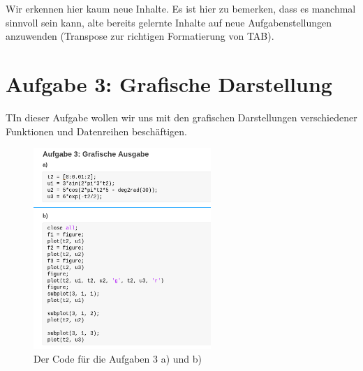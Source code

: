 \documentclass{article}
\begin{document}
Wir erkennen hier kaum neue Inhalte. Es ist hier zu bemerken, dass es manchmal sinnvoll sein kann, alte bereits gelernte Inhalte auf neue Aufgabenstellungen anzuwenden (Transpose zur richtigen Formatierung von TAB).
\newpage
\newpage


\section{Aufgabe 3: Grafische Darstellung}

\begin{task}
  TIn dieser Aufgabe wollen wir uns mit den grafischen Darstellungen verschiedener Funktionen und Datenreihen beschäftigen.
\end{task}

\begin{figure}[!h]
  \centering
  \includegraphics[width=0.6\textwidth]{../assets/images/ET2P6/aufgaben3ab.png}
  \caption{Der Code für die Aufgaben 3 a) und b)}
  \label{fig:auf3ab}
\end{figure}
\end{document}
